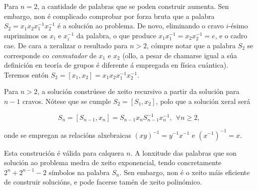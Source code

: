 \begin{refsection}
\begin{multicols}{2}
Para $n=2$, a cantidade de palabras que se poden construir aumenta. Sen
embargo, non é complicado comprobar por forza bruta que a palabra $S_2 = x_1
x_2 x_1^{-1} x_2^{-1}$ é a solución ao problema. De novo, eliminando o cravo
$i$-ésimo suprimimos os $x_i$ e $x_i^{-1}$ da palabra, o que produce $x_1
x_1^{-1} = x_2 x_2^{-1} = e$, e o cadro cae. De cara a xeralizar o resultado
para $n>2$, cómpre notar que a palabra $S_2$ se corresponde co
\textit{conmutador} de $x_1$ e $x_2$ (ollo, a pesar de chamarse igual a súa
definición en teoría de grupos é diferente á empregada en física cuántica).
Teremos entón $S_2 = [x_1,x_2] = x_1 x_2 x_1^{-1} x_2^{-1}$.

Para $n>2$, a solución constrúese de xeito recursivo a partir da solución para
$n-1$ cravos. Nótese que se cumple $S_2 = [S_1,x_2]$, polo que a solución xeral
será

\begin{equation}
    S_n = [S_{n-1},x_n] = S_{n-1} x_n S_{n-1}^{-1} x_n^{-1},
    ~~ \forall n \geq 2,
\end{equation}

\noindent onde se empregan as relacións
alxebraicas $(x y)^{-1} = y^{-1} x^{-1}$ e $(x^{-1})^{-1} = x$.

Esta construción é válida para calquera $n$. A lonxitude das palabras que son
solución ao problema medra de xeito exponencial, tendo concretamente $2^n +
2^{n-1} - 2$ símbolos na palabra $S_n$. Sen embargo, non é o xeito máis
eficiente de construir solucións, e pode facerse tamén de xeito polinómico.

\cite{Demaine_2013}
\printbibliography

\end{multicols}
\end{refsection}